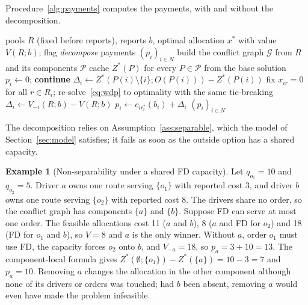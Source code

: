 \documentclass[review,12pt]{elsarticle}
\theoremstyle{definition}
\newtheorem{example}[theorem]{Example}
\theoremstyle{remark}
\begin{document}
Procedure~\ref{alg:payments} computes the payments, with and without the
decomposition.

\begin{algorithm}[!htbp]
\caption{\textsc{Payments}$(R,b,x^\ast)$: exact Clarke-pivot payments (Algorithm C)}
\label{alg:payments}
\begin{algorithmic}[1]
\Require pools $R$ (fixed before reports), reports $b$, optimal allocation $x^\ast$ with value $V(R;b)$; flag \textit{decompose}
\Ensure payments $(p_i)_{i\in N}$
 
  \State build the conflict graph $\mathcal G$ from $R$ and its components $\mathcal P$
  \State cache $Z^\ast(P)$ for every $P\in\mathcal P$ from the base solution
\EndIf
{}
   $p_i\gets 0$; \textbf{continue} \EndIf
    \State $\Delta_i\gets Z^\ast(P(i)\setminus\{i\};O(P(i)))-Z^\ast(P(i))$ 
  \Else
    \State fix $x_{ir}=0$ for all $r\in R_i$; re-solve~\eqref{eq:wdp} to optimality with the same tie-breaking
    \State $\Delta_i\gets V_{-i}(R;b)-V(R;b)$
  \EndIf
  \State $p_i\gets c_{ir_i^\ast}(b_i)+\Delta_i$
\EndFor
\State \Return $(p_i)_{i\in N}$
\end{algorithmic}
\end{algorithm}

The decomposition relies on Assumption~\ref{ass:separable}, which the model
of Section~\ref{sec:model} satisfies; it fails as soon as the outside option
has a shared capacity.

\begin{example}[Non-separability under a shared FD capacity]
\label{ex:nonsep}
Let $q_{o_1}=10$ and $q_{o_2}=5$. Driver $a$ owns one route serving
$\{o_1\}$ with reported cost 3, and driver $b$ owns one route serving
$\{o_2\}$ with reported cost 8. The drivers share no order, so the conflict
graph has components $\{a\}$ and $\{b\}$. Suppose FD can serve at most one
order. The feasible allocations cost 11 ($a$ and $b$), 8 ($a$ and FD for
$o_2$) and 18 (FD for $o_1$ and $b$), so $V=8$ and $a$ is the only winner.
Without $a$, order $o_1$ must use FD, the capacity forces $o_2$ onto $b$,
and $V_{-a}=18$, so $p_a=3+10=13$. The component-local formula gives
$Z^\ast(\emptyset;\{o_1\})-Z^\ast(\{a\})=10-3=7$ and $p_a=10$. Removing $a$
changes the allocation in the other component although none of its drivers
or orders was touched; had $b$ been absent, removing $a$ would even have
made the problem infeasible.
\end{example}
\end{document}
